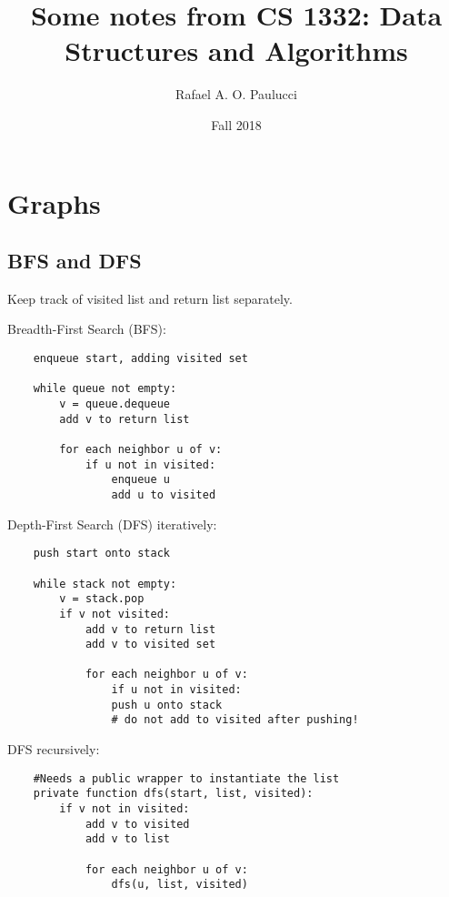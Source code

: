 \documentclass[english,openany]{book}
\begin{document}
    \title{Some notes from CS 1332: Data Structures and Algorithms}
    \author{Rafael A. O. Paulucci}
    \date{Fall 2018}

    \maketitle

    \tableofcontents


    \chapter{Graphs}

    \section{BFS and DFS}

    Keep track of visited list and return list separately.

    Breadth-First Search (BFS):

    \begin{lstlisting}
    enqueue start, adding visited set

    while queue not empty:
        v = queue.dequeue
        add v to return list

        for each neighbor u of v:
            if u not in visited:
                enqueue u
                add u to visited
    \end{lstlisting}

    Depth-First Search (DFS) iteratively:

    \begin{lstlisting}
    push start onto stack

    while stack not empty:
        v = stack.pop
        if v not visited:
            add v to return list
            add v to visited set

            for each neighbor u of v:
                if u not in visited:
                push u onto stack
                # do not add to visited after pushing!
    \end{lstlisting}

    DFS recursively:

    \begin{lstlisting}
    #Needs a public wrapper to instantiate the list
    private function dfs(start, list, visited):
        if v not in visited:
            add v to visited
            add v to list

            for each neighbor u of v:
                dfs(u, list, visited)
    \end{lstlisting}
\end{document}
